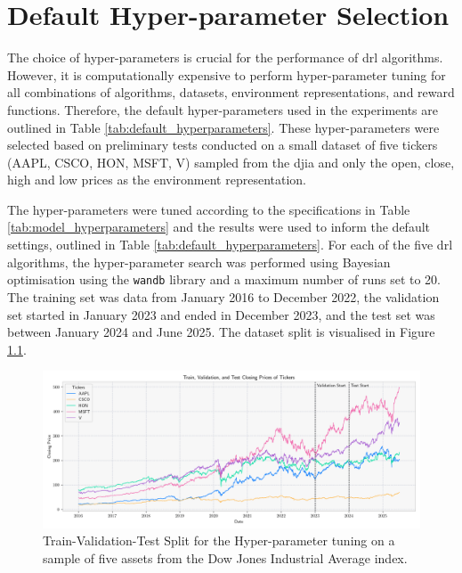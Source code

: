 \chapter{Default Hyper-parameter Selection} \label{app:experiment_hyperparameters}

The choice of hyper-parameters is crucial for the performance of \acrshort{drl} algorithms. However, it is computationally expensive to perform hyper-parameter tuning for all combinations of algorithms, datasets, environment representations, and reward functions. Therefore, the default hyper-parameters used in the experiments are outlined in Table \ref{tab:default_hyperparameters}. These hyper-parameters were selected based on preliminary tests conducted on a small dataset of five tickers (AAPL, CSCO, HON, MSFT, V) sampled from the \acrshort{djia} and only the open, close, high and low prices as the environment representation.

The hyper-parameters were tuned according to the specifications in Table \ref{tab:model_hyperparameters} and the results were used to inform the default settings, outlined in Table \ref{tab:default_hyperparameters}. For each of the five \acrshort{drl} algorithms, the hyper-parameter search was performed using Bayesian optimisation using the \texttt{wandb} library and a maximum number of runs set to 20. The training set was data from January 2016 to December 2022, the validation set started in January 2023 and ended in December 2023, and the test set was between January 2024 and June 2025. The dataset split is visualised in Figure \ref{fig:dataset_split}. 

\begin{figure}[h]
    \centering
    \includegraphics[width=\textwidth]{figures/dataset_split.png}
    \caption{Train-Validation-Test Split for the Hyper-parameter tuning on a sample of five assets from the Dow Jones Industrial Average index.}
    \label{fig:dataset_split}
\end{figure}

